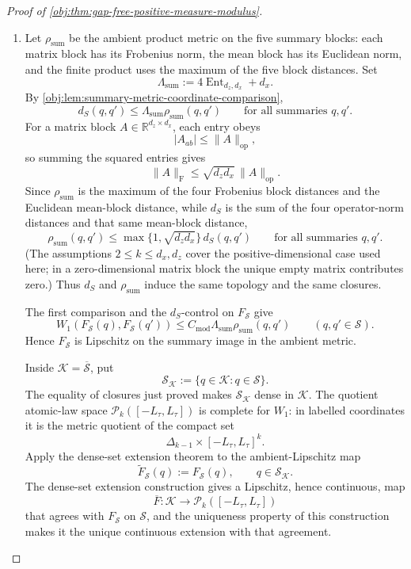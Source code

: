 \documentclass[11pt]{article}
\begin{document}
\begin{proof}[Proof of \cref{obj:thm:gap-free-positive-measure-modulus}]
\begin{enumerate}
\item Let \(\rho_{\mathrm{sum}}\) be the ambient product metric on the five summary blocks: each matrix block has its Frobenius norm, the mean block has its Euclidean norm, and the finite product uses the maximum of the five block distances.  Set
\[
\Lambda_{\mathrm{sum}}:=4\operatorname{Ent}_{d_z,d_x}+d_x .
\]
By \cref{obj:lem:summary-metric-coordinate-comparison},
\[
d_S(q,q')
\le
\Lambda_{\mathrm{sum}}\rho_{\mathrm{sum}}(q,q')
\qquad\text{for all summaries }q,q'.
\]
For a matrix block \(A\in\mathbb R^{d_z\times d_x}\), each entry obeys
\[
|A_{ab}|\le\|A\|_{\mathrm{op}},
\]
so summing the squared entries gives
\[
\|A\|_{\mathrm F}\le\sqrt{d_zd_x}\,\|A\|_{\mathrm{op}}.
\]
Since \(\rho_{\mathrm{sum}}\) is the maximum of the four Frobenius block distances and the Euclidean mean-block distance, while \(d_S\) is the sum of the four operator-norm distances and that same mean-block distance,
\[
\rho_{\mathrm{sum}}(q,q')
\le
\max\{1,\sqrt{d_zd_x}\}\,d_S(q,q')
\qquad\text{for all summaries }q,q'.
\]
(The assumptions \(2\le k\le d_x,d_z\) cover the positive-dimensional case used here; in a zero-dimensional matrix block the unique empty matrix contributes zero.)  Thus \(d_S\) and \(\rho_{\mathrm{sum}}\) induce the same topology and the same closures.

The first comparison and the \(d_S\)-control on \(F_{\mathscr S}\) give
\[
W_1(F_{\mathscr S}(q),F_{\mathscr S}(q'))
\le
C_{\mathrm{mod}}\Lambda_{\mathrm{sum}}\rho_{\mathrm{sum}}(q,q')
\qquad(q,q'\in\mathscr S).
\]
Hence \(F_{\mathscr S}\) is Lipschitz on the summary image in the ambient metric.

Inside \(\mathcal K=\overline{\mathscr S}\), put
\[
\mathscr S_{\mathcal K}:=\{q\in\mathcal K:q\in\mathscr S\}.
\]
The equality of closures just proved makes \(\mathscr S_{\mathcal K}\) dense in \(\mathcal K\).  The quotient atomic-law space \(\mathcal P_k([-L_\tau,L_\tau])\) is complete for \(W_1\): in labelled coordinates it is the metric quotient of the compact set
\[
\Delta_{k-1}\times[-L_\tau,L_\tau]^k.
\]
Apply the dense-set extension theorem to the ambient-Lipschitz map
\[
\widetilde F_{\mathscr S}(q):=F_{\mathscr S}(q),
\qquad q\in\mathscr S_{\mathcal K}.
\]
The dense-set extension construction gives a Lipschitz, hence continuous, map
\[
\overline F:\mathcal K\to\mathcal P_k([-L_\tau,L_\tau])
\]
that agrees with \(F_{\mathscr S}\) on \(\mathscr S\), and the uniqueness property of this construction makes it the unique continuous extension with that agreement.


\end{enumerate}
\end{proof}
\end{document}
